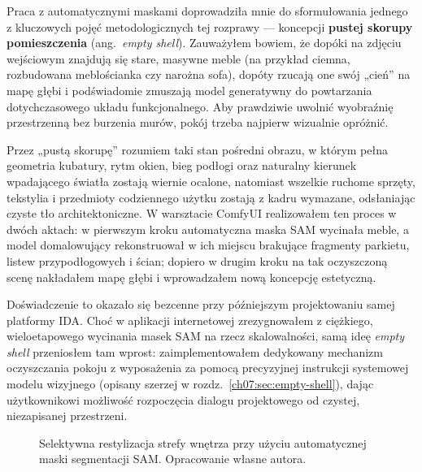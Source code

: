 Praca z automatycznymi maskami doprowadziła mnie do sformułowania jednego z kluczowych pojęć metodologicznych tej rozprawy --- koncepcji \textbf{pustej skorupy pomieszczenia} (ang.\ \emph{empty shell}). Zauważyłem bowiem, że dopóki na zdjęciu wejściowym znajdują się stare, masywne meble (na przykład ciemna, rozbudowana meblościanka czy narożna sofa), dopóty rzucają one swój „cień” na mapę głębi i podświadomie zmuszają model generatywny do powtarzania dotychczasowego układu funkcjonalnego. Aby prawdziwie uwolnić wyobraźnię przestrzenną bez burzenia murów, pokój trzeba najpierw wizualnie opróżnić.

Przez „pustą skorupę” rozumiem taki stan pośredni obrazu, w którym pełna geometria kubatury, rytm okien, bieg podłogi oraz naturalny kierunek wpadającego światła zostają wiernie ocalone, natomiast wszelkie ruchome sprzęty, tekstylia i przedmioty codziennego użytku zostają z kadru wymazane, odsłaniając czyste tło architektoniczne. W warsztacie ComfyUI realizowałem ten proces w dwóch aktach: w pierwszym kroku automatyczna maska SAM wycinała meble, a model domalowujący rekonstruował w ich miejscu brakujące fragmenty parkietu, listew przypodłogowych i ścian; dopiero w drugim kroku na tak oczyszczoną scenę nakładałem mapę głębi i wprowadzałem nową koncepcję estetyczną.

Doświadczenie to okazało się bezcenne przy późniejszym projektowaniu samej platformy IDA. Choć w aplikacji internetowej zrezygnowałem z ciężkiego, wieloetapowego wycinania masek SAM na rzecz skalowalności, samą ideę \emph{empty shell} przeniosłem tam wprost: zaimplementowałem dedykowany mechanizm oczyszczania pokoju z wyposażenia za pomocą precyzyjnej instrukcji systemowej modelu wizyjnego (opisany szerzej w rozdz.~\ref{ch07:sec:empty-shell}), dając użytkownikowi możliwość rozpoczęcia dialogu projektowego od czystej, niezapisanej przestrzeni.

\begin{figure}[htbp]
  \centering
  \caption{Selektywna restylizacja strefy wnętrza przy użyciu automatycznej maski segmentacji SAM.
  Opracowanie własne autora.}
  \label{fig:ch04:sam}
\end{figure}

